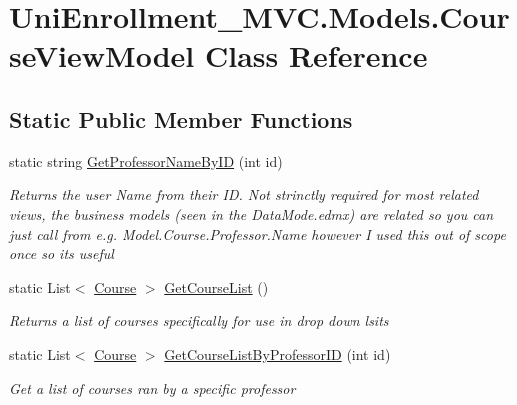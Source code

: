 \hypertarget{class_uni_enrollment___m_v_c_1_1_models_1_1_course_view_model}{}\section{Uni\+Enrollment\+\_\+\+M\+V\+C.\+Models.\+Course\+View\+Model Class Reference}
\label{class_uni_enrollment___m_v_c_1_1_models_1_1_course_view_model}
\subsection*{Static Public Member Functions}
\begin{DoxyCompactItemize}
\item 
static string \hyperlink{class_uni_enrollment___m_v_c_1_1_models_1_1_course_view_model_a976367559f2ac0f57f873769aa4a3377}{Get\+Professor\+Name\+By\+ID} (int id)
\begin{DoxyCompactList}\small\item\em Returns the user \textquotesingle{}Name\textquotesingle{} from their ID. Not strinctly required for most related views, the business models (seen in the Data\+Mode.\+edmx) are related so you can just call from e.\+g. Model.\+Course.\+Professor.\+Name however I used this out of scope once so it\textquotesingle{}s useful \end{DoxyCompactList}\item 
static List$<$ \hyperlink{class_uni_enrollment___m_v_c_1_1_models_1_1_course}{Course} $>$ \hyperlink{class_uni_enrollment___m_v_c_1_1_models_1_1_course_view_model_acdcd8c1864587d0c8ab23e460ed8d901}{Get\+Course\+List} ()
\begin{DoxyCompactList}\small\item\em Returns a list of courses specifically for use in drop down lsits \end{DoxyCompactList}\item 
static List$<$ \hyperlink{class_uni_enrollment___m_v_c_1_1_models_1_1_course}{Course} $>$ \hyperlink{class_uni_enrollment___m_v_c_1_1_models_1_1_course_view_model_a295886fe092d5245f6685ca0ff78bf3f}{Get\+Course\+List\+By\+Professor\+ID} (int id)
\begin{DoxyCompactList}\small\item\em Get a list of courses ran by a specific professor \end{DoxyCompactList}\end{DoxyCompactItemize}
